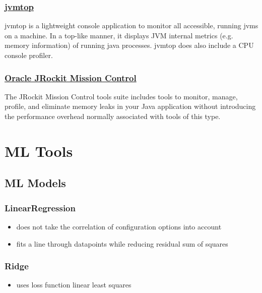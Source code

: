 \subsubsection{\href{https://github.com/patric-r/jvmtop}{jvmtop}}

jvmtop is a lightweight console application to monitor all accessible, running jvms on a machine.
In a top-like manner, it displays JVM internal metrics (e.g. memory information) of running java processes.
jvmtop does also include a CPU console profiler.


\subsubsection{\href{http://www.oracle.com/technetwork/middleware/jrockit/overview/index-090630.html}{Oracle JRockit Mission Control}}

The JRockit Mission Control tools suite includes tools to monitor, manage, profile, and eliminate memory leaks in your Java application without introducing the performance overhead normally associated with tools of this type.


\section{ML Tools}

\subsection{ML Models}

\subsubsection{LinearRegression}
\begin{itemize}
	\item does not take the correlation of configuration options into account
	\item fits a line through datapoints while reducing residual sum of squares
\end{itemize}
\subsubsection{Ridge}
\begin{itemize}
	\item uses loss function linear least squares
\end{itemize}
